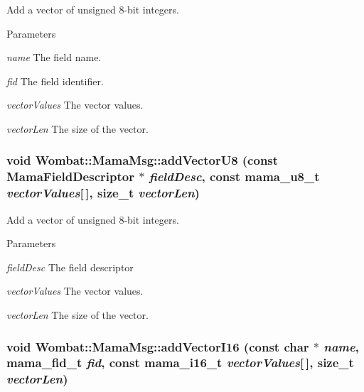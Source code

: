 Add a vector of unsigned 8-\/bit integers. 
\begin{DoxyParams}{Parameters}
\item[{\em name}]The field name. \item[{\em fid}]The field identifier. \item[{\em vectorValues}]The vector values. \item[{\em vectorLen}]The size of the vector. \end{DoxyParams}
\hypertarget{classWombat_1_1MamaMsg_aedd6c686eb74cf01aca0933c9cad9f4f}{
\subsubsection[{addVectorU8}]{\setlength{\rightskip}{0pt plus 5cm}void Wombat::MamaMsg::addVectorU8 (const {\bf MamaFieldDescriptor} $\ast$ {\em fieldDesc}, \/  const mama\_\-u8\_\-t {\em vectorValues}\mbox{[}$\,$\mbox{]}, \/  size\_\-t {\em vectorLen})}}
\label{classWombat_1_1MamaMsg_aedd6c686eb74cf01aca0933c9cad9f4f}


Add a vector of unsigned 8-\/bit integers. 
\begin{DoxyParams}{Parameters}
\item[{\em fieldDesc}]The field descriptor \item[{\em vectorValues}]The vector values. \item[{\em vectorLen}]The size of the vector. \end{DoxyParams}
\hypertarget{classWombat_1_1MamaMsg_aa706f8a179fb8656e365d19f9f78aad1}{
\subsubsection[{addVectorI16}]{\setlength{\rightskip}{0pt plus 5cm}void Wombat::MamaMsg::addVectorI16 (const char $\ast$ {\em name}, \/  mama\_\-fid\_\-t {\em fid}, \/  const mama\_\-i16\_\-t {\em vectorValues}\mbox{[}$\,$\mbox{]}, \/  size\_\-t {\em vectorLen})}}
\label{classWombat_1_1MamaMsg_aa706f8a179fb8656e365d19f9f78aad1}


